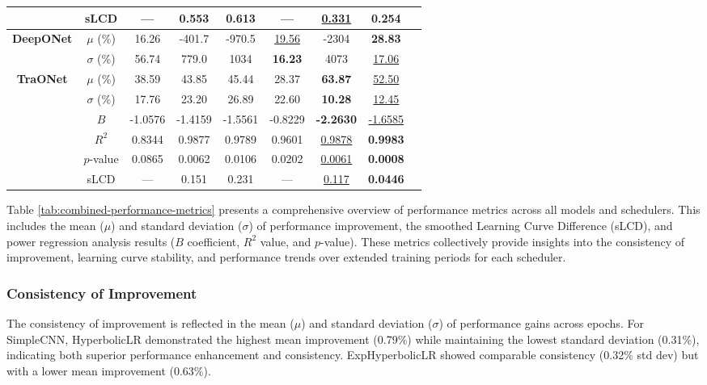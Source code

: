 \documentclass{article}
\theoremstyle{plain}
\theoremstyle{definition}
\theoremstyle{remark}
\begin{document}
\begin{table}[!t]
\begin{center}
\begin{small}
\begin{sc}
\begin{tabular}{ccccccccc}
& sLCD & --- & 0.553 & 0.613 & --- & \underline{0.331} & \textbf{0.254} \\
\midrule
\multirow{2}{*}{\textbf{DeepONet}} & $\mu$ (\%) & 16.26 & -401.7 & -970.5 & \underline{19.56} & -2304 & \textbf{28.83} \\
& $\sigma$ (\%) & 56.74 & 779.0 & 1034 & \textbf{16.23} & 4073 & \underline{17.06} \\
\midrule
\multirow{6}{*}{\textbf{TraONet}} & $\mu$ (\%) & 38.59 & 43.85 & 45.44 & 28.37 & \textbf{63.87} & \underline{52.50} \\
& $\sigma$ (\%) & 17.76 & 23.20 & 26.89 & 22.60 & \textbf{10.28} & \underline{12.45} \\
& $B$ & -1.0576 & -1.4159 & -1.5561 & -0.8229 & \textbf{-2.2630} & \underline{-1.6585} \\
& $R^2$ & 0.8344 & 0.9877 & 0.9789 & 0.9601 & \underline{0.9878} & \textbf{0.9983} \\
& $p$-value & 0.0865 & 0.0062 & 0.0106 & 0.0202 & \underline{0.0061} & \textbf{0.0008} \\
& sLCD & --- & 0.151 & 0.231 & --- & \underline{0.117} & \textbf{0.0446} \\
\bottomrule
\end{tabular}
\end{sc}
\end{small}
\end{center}
\vskip -0.1in
\end{table}

Table \ref{tab:combined-performance-metrics} presents a comprehensive overview of performance metrics across all models and schedulers.
This includes the mean ($\mu$) and standard deviation ($\sigma$) of performance improvement, the smoothed Learning Curve Difference (sLCD), and power regression analysis results ($B$ coefficient, $R^2$ value, and $p$-value).
These metrics collectively provide insights into the consistency of improvement, learning curve stability, and performance trends over extended training periods for each scheduler.

\subsubsection{Consistency of Improvement}
\label{subsubsec:consistency}

The consistency of improvement is reflected in the mean ($\mu$) and standard deviation ($\sigma$) of performance gains across epochs. For SimpleCNN, HyperbolicLR demonstrated the highest mean improvement (0.79\%) while maintaining the lowest standard deviation (0.31\%), indicating both superior performance enhancement and consistency. ExpHyperbolicLR showed comparable consistency (0.32\% std dev) but with a lower mean improvement (0.63\%).
\end{document}

